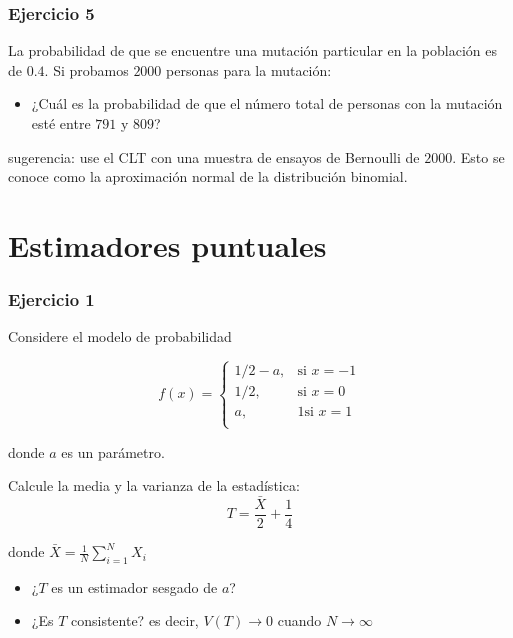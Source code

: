 \documentclass[
]{book}
\providecommand{\tightlist}{%
  \setlength{\itemsep}{0pt}\setlength{\parskip}{0pt}}
\begin{document}
\hypertarget{ejercicio-5-2}{%
\subsubsection{Ejercicio 5}\label{ejercicio-5-2}}

La probabilidad de que se encuentre una mutación particular en la población es de \(0.4\). Si probamos \(2000\) personas para la mutación:

\begin{itemize}
\tightlist
\item
  ¿Cuál es la probabilidad de que el número total de personas con la mutación esté entre \(791\) y \(809\)?
\end{itemize}

sugerencia: use el CLT con una muestra de ensayos de Bernoulli de \(2000\). Esto se conoce como la aproximación normal de la distribución binomial.

\hypertarget{estimadores-puntuales}{%
\section{Estimadores puntuales}\label{estimadores-puntuales}}

\hypertarget{ejercicio-1-6}{%
\subsubsection{Ejercicio 1}\label{ejercicio-1-6}}

Considere el modelo de probabilidad

\[
    f(x)= 
\begin{cases}
    1/2-a,& \text{si } x=-1 \\ 
    1/2,& \text{si } x=0\\
    a,& 1 \text{si } x=1\\ 
\end{cases}
\]

donde \(a\) es un parámetro.

Calcule la media y la varianza de la estadística: \[T=\frac{\bar{X}}{2}+\frac{1}{4}\]

donde \(\bar{X}=\frac{1}{N}\sum_{i=1}^N X_i\)

\begin{itemize}
\item
  ¿\(T\) es un estimador sesgado de \(a\)?
\item
  ¿Es \(T\) consistente? es decir, \(V(T) \rightarrow 0\) cuando \(N\rightarrow \infty\)
\end{itemize}
\end{document}
